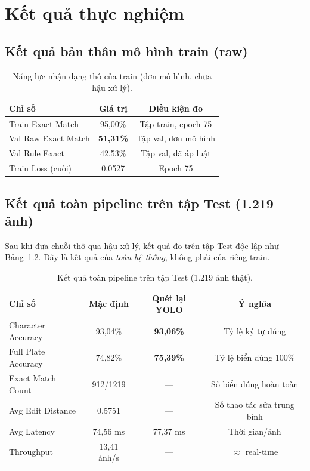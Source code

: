 \documentclass[12pt,a4paper]{report}
\begin{document}
\chapter{Kết quả thực nghiệm}

\section{Kết quả bản thân mô hình train (raw)}
\begin{table}[H]
\centering
\caption{Năng lực nhận dạng thô của train (đơn mô hình, chưa hậu xử lý).}
\label{tab:raw}
\begin{tabular}{lcc}
\toprule
\textbf{Chỉ số} & \textbf{Giá trị} & \textbf{Điều kiện đo} \\
\midrule
Train Exact Match & 95,00\% & Tập train, epoch 75 \\
Val Raw Exact Match & \textbf{51,31\%} & Tập val, đơn mô hình \\
Val Rule Exact & 42,53\% & Tập val, đã áp luật \\
Train Loss (cuối) & 0,0527 & Epoch 75 \\
\bottomrule
\end{tabular}
\end{table}

\section{Kết quả toàn pipeline trên tập Test (1.219 ảnh)}
Sau khi đưa chuỗi thô qua hậu xử lý, kết quả đo trên tập Test độc lập như Bảng~\ref{tab:pipeline}. Đây là kết quả của \emph{toàn hệ thống}, không phải của riêng train.

\begin{table}[H]
\centering
\caption{Kết quả toàn pipeline trên tập Test (1.219 ảnh thật).}
\label{tab:pipeline}
\begin{tabular}{lccc}
\toprule
\textbf{Chỉ số} & \textbf{Mặc định} & \textbf{Quét lại YOLO} & \textbf{Ý nghĩa} \\
\midrule
Character Accuracy & 93,04\% & \textbf{93,06\%} & Tỷ lệ ký tự đúng \\
Full Plate Accuracy & 74,82\% & \textbf{75,39\%} & Tỷ lệ biển đúng 100\% \\
Exact Match Count & 912/1219 & --- & Số biển đúng hoàn toàn \\
Avg Edit Distance & 0,5751 & --- & Số thao tác sửa trung bình \\
Avg Latency & 74,56 ms & 77,37 ms & Thời gian/ảnh \\
Throughput & 13,41 ảnh/s & --- & $\approx$ real-time \\
\bottomrule
\end{tabular}
\end{table}
\end{document}
